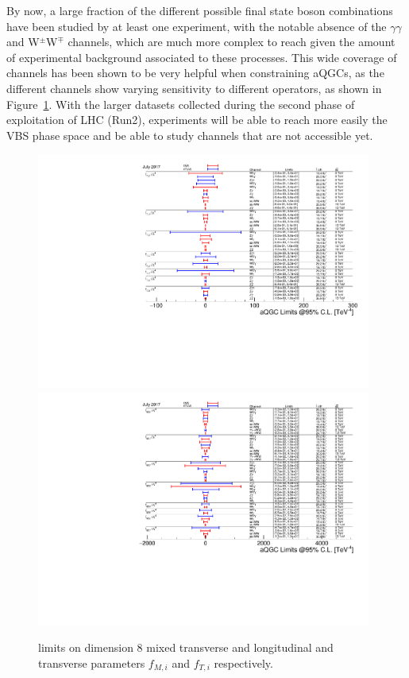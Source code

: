 By now, a large fraction of the different possible final state boson combinations have been studied by at least one experiment, with the notable absence of the $\gamma\gamma$ and W$^\pm$W$^\mp$ channels, which are much more complex to reach given the amount of experimental background associated to these processes. This wide coverage of channels has been shown to be very helpful when constraining aQGCs, as the different channels show varying sensitivity to different operators, as shown in Figure~\ref{fig:EFT}.
With the larger datasets collected during the second phase of exploitation of LHC (Run2), experiments will be able to reach more easily the VBS phase space and be able to study channels that are not accessible yet.

\begin{figure}[h!]
    \begin{center}
    \includegraphics[width=11cm,scale=1]{figures/aQGC_ft}
    \includegraphics[width=11cm,scale=1]{figures/aQGC_fm-2}
    \end{center}
    \caption{limits on dimension 8 mixed transverse and longitudinal and transverse parameters $f_{M,i}$ and $f_{T,i}$ respectively.}
    \label{fig:EFT}
\end{figure}



